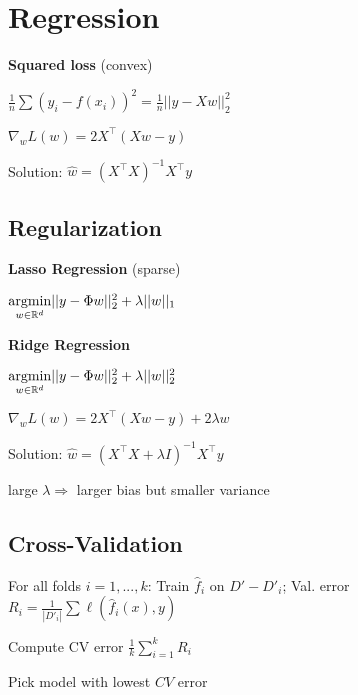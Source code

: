 \section*{Regression}

\textbf{Squared loss} \quad (convex)

\qquad \qquad $\frac{1}{n}\sum (y_i - f(x_i))^2 = \frac{1}{n}||y - X w||_2^2$

\qquad \qquad $\nabla_w L(w) = 2X^\top(Xw -y)$

Solution: $\hat{w} = (X^\top X)^{-1}X^\top y$

\subsection*{Regularization}

\textbf{Lasso Regression} \quad (sparse)

\qquad \qquad $\underset{w \in \mathbb{R}^d}{\text{argmin}} ||y - \Phi w||_2^2 + \lambda ||w||_1$

\textbf{Ridge Regression}

\qquad \qquad $\underset{w \in \mathbb{R}^d}{\text{argmin}} ||y - \Phi w||_2^2 + \lambda ||w||_2^2$

\qquad \qquad $\nabla_w L(w) = 2X^\top(Xw -y) + 2 \lambda w$

Solution: $\hat w = (X^\top X + \lambda I)^{-1} X^\top y$

large $\lambda \Rightarrow$ larger bias but smaller variance 

\subsection*{Cross-Validation}

\begin{rowlist}
	\item For all folds $i = 1,..., k$:  Train $\hat{f}_i$ on $D' - D'_i$; Val. error $R_i = \frac{1}{|D'_i|} \sum \ell(\hat{f}_i(x), y)$
	\item Compute CV error $\frac{1}{k} \sum_{i=1}^k R_i$
	\item Pick model with lowest $CV$ error
\end{rowlist}